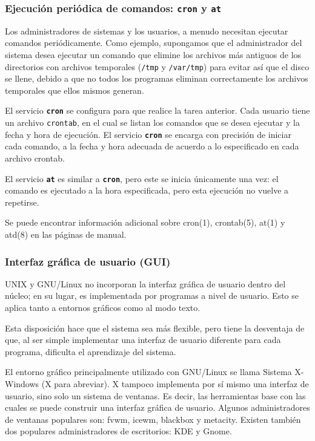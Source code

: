 \documentclass[12pt]{article}
\begin{document}
\subsubsection{Ejecución periódica de comandos: \texttt{\textbf{cron}} y
\texttt{\textbf{at}}}

 Los administradores de sistemas y los usuarios, a menudo necesitan
ejecutar comandos periódicamente. Como ejemplo, supongamos que el administrador
del sistema desea ejecutar un comando que elimine los archivos más antiguos de
los directorios con archivos temporales (\texttt{/tmp} y
\texttt{/var/tmp}) para evitar así que el disco se llene, debido a
que no todos los programas eliminan correctamente los archivos temporales que
ellos mismos generan.  

 El servicio \texttt{\textbf{cron}} se configura para que realice la
tarea anterior. Cada usuario tiene un archivo \texttt{crontab}, en
el cual se listan los comandos que se desea ejecutar y la fecha y hora de
ejecución. El servicio \texttt{\textbf{cron}} se encarga con precisión de
iniciar cada comando, a la fecha y hora adecuada de acuerdo a lo especificado en
cada archivo crontab.  

 El servicio \texttt{\textbf{at}} es similar a \texttt{\textbf{cron}},
pero este se inicia únicamente una vez: el comando es ejecutado a la hora
especificada, pero esta ejecución no vuelve a repetirse.  

 Se puede encontrar información adicional sobre cron(1), crontab(5), at(1)
y atd(8) en las páginas de manual.  

\subsubsection{ Interfaz gráfica de usuario (GUI)}

 UNIX y GNU/Linux no incorporan la interfaz gráfica de usuario dentro del
núcleo; en su lugar, es implementada por programas a nivel de usuario. Esto se
aplica tanto a entornos gráficos como al modo texto.  

 Esta disposición hace que el sistema sea más flexible, pero tiene la
desventaja de que, al ser simple implementar una interfaz de usuario diferente
para cada programa, dificulta el aprendizaje del sistema.  

 El entorno gráfico principalmente utilizado con GNU/Linux se llama
Sistema X-Windows (X para abreviar). X tampoco implementa por sí mismo una
interfaz de usuario, sino solo un sistema de ventanas. Es decir, las
herramientas base con las cuales se puede construir una interfaz gráfica de
usuario. Algunos administradores de ventanas populares son: fvwm, icewm,
blackbox y metacity. Existen también dos populares administradores de
escritorios: KDE y Gnome.  
\end{document}
